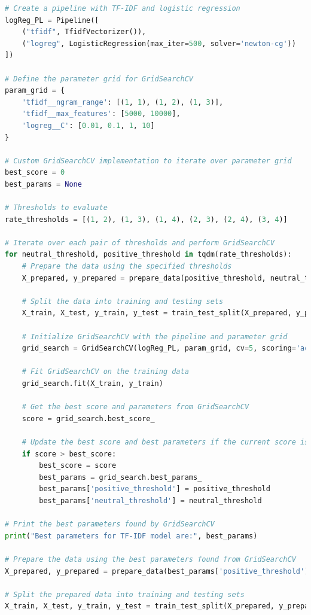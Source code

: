 \documentclass{solutionclass} %
\begin{document}
\begin{lstlisting}[language=Python]
	# Create a pipeline with TF-IDF and logistic regression
logReg_PL = Pipeline([
    ("tfidf", TfidfVectorizer()),
    ("logreg", LogisticRegression(max_iter=500, solver='newton-cg'))
])

# Define the parameter grid for GridSearchCV
param_grid = {
    'tfidf__ngram_range': [(1, 1), (1, 2), (1, 3)],
    'tfidf__max_features': [5000, 10000],
    'logreg__C': [0.01, 0.1, 1, 10]
}

# Custom GridSearchCV implementation to iterate over parameter grid
best_score = 0
best_params = None

# Thresholds to evaluate
rate_thresholds = [(1, 2), (1, 3), (1, 4), (2, 3), (2, 4), (3, 4)]

# Iterate over each pair of thresholds and perform GridSearchCV
for neutral_threshold, positive_threshold in tqdm(rate_thresholds):
    # Prepare the data using the specified thresholds
    X_prepared, y_prepared = prepare_data(positive_threshold, neutral_threshold)
    
    # Split the data into training and testing sets
    X_train, X_test, y_train, y_test = train_test_split(X_prepared, y_prepared, test_size=0.1, random_state=42)
    
    # Initialize GridSearchCV with the pipeline and parameter grid
    grid_search = GridSearchCV(logReg_PL, param_grid, cv=5, scoring='accuracy')
    
    # Fit GridSearchCV on the training data
    grid_search.fit(X_train, y_train)
    
    # Get the best score and parameters from GridSearchCV
    score = grid_search.best_score_
    
    # Update the best score and best parameters if the current score is better
    if score > best_score:
        best_score = score
        best_params = grid_search.best_params_
        best_params['positive_threshold'] = positive_threshold
        best_params['neutral_threshold'] = neutral_threshold

# Print the best parameters found by GridSearchCV
print("Best parameters for TF-IDF model are:", best_params)

# Prepare the data using the best parameters found from GridSearchCV
X_prepared, y_prepared = prepare_data(best_params['positive_threshold'], best_params['neutral_threshold'])

# Split the prepared data into training and testing sets
X_train, X_test, y_train, y_test = train_test_split(X_prepared, y_prepared, test_size=0.1, random_state=42)


\end{lstlisting}
\end{document}
